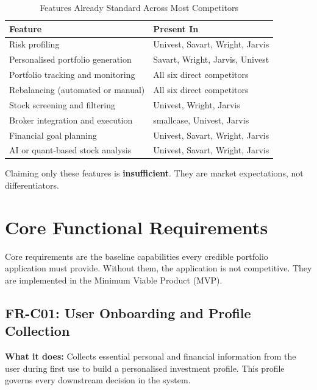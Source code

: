 \documentclass[12pt, a4paper, openany, oneside]{report}
\begin{document}
\begin{table}[H]
\centering
\caption{Features Already Standard Across Most Competitors}
\label{tab:common}
\begin{tabularx}{\textwidth}{|X|l|}
\hline
\textbf{Feature} & \textbf{Present In} \\
\hline
Risk profiling & Univest, Savart, Wright, Jarvis \\
Personalised portfolio generation & Savart, Wright, Jarvis, Univest \\
Portfolio tracking and monitoring & All six direct competitors \\
Rebalancing (automated or manual) & All six direct competitors \\
Stock screening and filtering & Univest, Wright, Jarvis \\
Broker integration and execution & smallcase, Univest, Jarvis \\
Financial goal planning & Univest, Savart, Wright, Jarvis \\
AI or quant-based stock analysis & Univest, Savart, Wright, Jarvis \\
\hline
\end{tabularx}
\end{table}

Claiming only these features is \textbf{insufficient}. They are market expectations, not differentiators.

\chapter{Core Functional Requirements}

Core requirements are the baseline capabilities every credible portfolio application must provide. Without them, the application is not competitive. They are implemented in the Minimum Viable Product (MVP).

\section{FR-C01: User Onboarding and Profile Collection}

\textbf{What it does:} Collects essential personal and financial information from the user during first use to build a personalised investment profile. This profile governs every downstream decision in the system.
\end{document}
